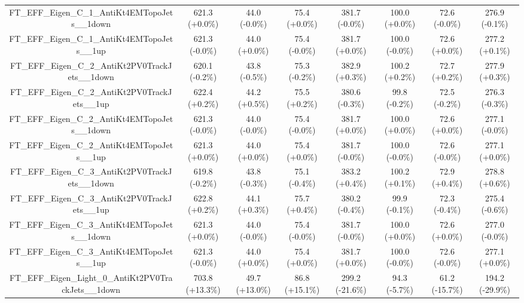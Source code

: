 \begin{table}[htbp!]
\begin{tiny}
\begin{center}
\begin{tabular}{c|c|c|c||c|c|c|c}
FT\_EFF\_Eigen\_C\_1\_AntiKt4EMTopoJets\_\_1down             & 621.3     (+0.0\%) & 44.0      (-0.0\%) & 75.4      (+0.0\%) & 381.7     (-0.0\%) & 100.0     (+0.0\%) & 72.6      (-0.0\%) & 276.9     (-0.1\%) \\ 
FT\_EFF\_Eigen\_C\_1\_AntiKt4EMTopoJets\_\_1up               & 621.3     (-0.0\%) & 44.0      (+0.0\%) & 75.4      (-0.0\%) & 381.7     (+0.0\%) & 100.0     (-0.0\%) & 72.6      (+0.0\%) & 277.2     (+0.1\%) \\ 
FT\_EFF\_Eigen\_C\_2\_AntiKt2PV0TrackJets\_\_1down           & 620.1     (-0.2\%) & 43.8      (-0.5\%) & 75.3      (-0.2\%) & 382.9     (+0.3\%) & 100.2     (+0.2\%) & 72.7      (+0.2\%) & 277.9     (+0.3\%) \\ 
FT\_EFF\_Eigen\_C\_2\_AntiKt2PV0TrackJets\_\_1up             & 622.4     (+0.2\%) & 44.2      (+0.5\%) & 75.5      (+0.2\%) & 380.6     (-0.3\%) & 99.8      (-0.2\%) & 72.5      (-0.2\%) & 276.3     (-0.3\%) \\ 
FT\_EFF\_Eigen\_C\_2\_AntiKt4EMTopoJets\_\_1down             & 621.3     (-0.0\%) & 44.0      (-0.0\%) & 75.4      (-0.0\%) & 381.7     (+0.0\%) & 100.0     (+0.0\%) & 72.6      (+0.0\%) & 277.1     (-0.0\%) \\ 
FT\_EFF\_Eigen\_C\_2\_AntiKt4EMTopoJets\_\_1up               & 621.3     (+0.0\%) & 44.0      (+0.0\%) & 75.4      (+0.0\%) & 381.7     (-0.0\%) & 100.0     (-0.0\%) & 72.6      (-0.0\%) & 277.1     (+0.0\%) \\ 
FT\_EFF\_Eigen\_C\_3\_AntiKt2PV0TrackJets\_\_1down           & 619.8     (-0.2\%) & 43.8      (-0.3\%) & 75.1      (-0.4\%) & 383.2     (+0.4\%) & 100.2     (+0.1\%) & 72.9      (+0.4\%) & 278.8     (+0.6\%) \\ 
FT\_EFF\_Eigen\_C\_3\_AntiKt2PV0TrackJets\_\_1up             & 622.8     (+0.2\%) & 44.1      (+0.3\%) & 75.7      (+0.4\%) & 380.2     (-0.4\%) & 99.9      (-0.1\%) & 72.3      (-0.4\%) & 275.4     (-0.6\%) \\ 
FT\_EFF\_Eigen\_C\_3\_AntiKt4EMTopoJets\_\_1down             & 621.3     (+0.0\%) & 44.0      (-0.0\%) & 75.4      (-0.0\%) & 381.7     (-0.0\%) & 100.0     (+0.0\%) & 72.6      (+0.0\%) & 277.0     (-0.0\%) \\ 
FT\_EFF\_Eigen\_C\_3\_AntiKt4EMTopoJets\_\_1up               & 621.3     (-0.0\%) & 44.0      (+0.0\%) & 75.4      (+0.0\%) & 381.7     (+0.0\%) & 100.0     (-0.0\%) & 72.6      (-0.0\%) & 277.1     (+0.0\%) \\ 
FT\_EFF\_Eigen\_Light\_0\_AntiKt2PV0TrackJets\_\_1down       & 703.8     (+13.3\%) & 49.7      (+13.0\%) & 86.8      (+15.1\%) & 299.2     (-21.6\%) & 94.3      (-5.7\%) & 61.2      (-15.7\%) & 194.2     (-29.9\%) \\ 

\end{tabular}
\end{center}
\end{tiny}
\end{table}
